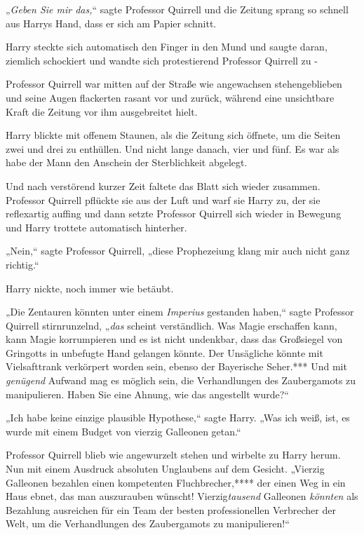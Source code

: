 {„\emph{Geben Sie mir das,}“ sagte Professor Quirrell und die Zeitung sprang so schnell aus Harrys Hand, dass er sich am Papier schnitt.

Harry steckte sich automatisch den Finger in den Mund und saugte daran, ziemlich schockiert und wandte sich protestierend Professor Quirrell zu -

Professor Quirrell war mitten auf der Straße wie angewachsen stehengeblieben und seine Augen flackerten rasant vor und zurück, während eine unsichtbare Kraft die Zeitung vor ihm ausgebreitet hielt.

Harry blickte mit offenem Staunen, als die Zeitung sich öffnete, um die Seiten zwei und drei zu enthüllen. Und nicht lange danach, vier und fünf. Es war als habe der Mann den Anschein der Sterblichkeit abgelegt.

Und nach verstörend kurzer Zeit faltete das Blatt sich wieder zusammen. Professor Quirrell pflückte sie aus der Luft und warf sie Harry zu, der sie reflexartig auffing und dann setzte Professor Quirrell sich wieder in Bewegung und Harry trottete automatisch hinterher.

„Nein,“ sagte Professor Quirrell, „diese Prophezeiung klang mir auch nicht ganz richtig.“

Harry nickte, noch immer wie betäubt.

„Die Zentauren könnten unter einem \emph{Imperius} gestanden haben,“ sagte Professor Quirrell stirnrunzelnd, „\emph{das} scheint verständlich. Was Magie erschaffen kann, kann Magie korrumpieren und es ist nicht undenkbar, dass das Großsiegel von Gringotts in unbefugte Hand gelangen könnte. Der Unsägliche könnte mit Vielsafttrank verkörpert worden sein, ebenso der Bayerische Seher.*** Und mit \emph{genügend} Aufwand mag es möglich sein, die Verhandlungen des Zaubergamots zu manipulieren. Haben Sie eine Ahnung, wie das angestellt wurde?“

„Ich habe keine einzige plausible Hypothese,“ sagte Harry. „Was ich weiß, ist, es wurde mit einem Budget von vierzig Galleonen getan.“

Professor Quirrell blieb wie angewurzelt stehen und wirbelte zu Harry herum. Nun mit einem Ausdruck absoluten Unglaubens auf dem Gesicht. „Vierzig Galleonen bezahlen einen kompetenten Fluchbrecher,**** der einen Weg in ein Haus ebnet, das man auszurauben wünscht! Vierzig\emph{tausend} Galleonen \emph{könnten} als Bezahlung ausreichen für ein Team der besten professionellen Verbrecher der Welt, um die Verhandlungen des Zaubergamots zu manipulieren!“

}
